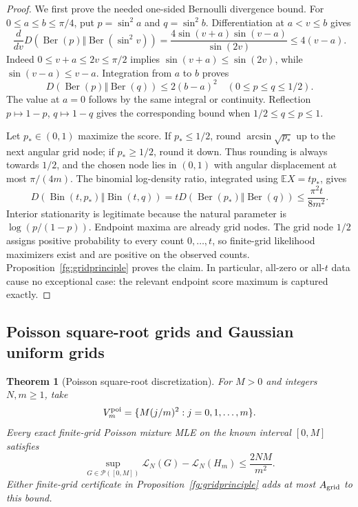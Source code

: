 \documentclass[11pt,a4paper]{article}
\newtheorem{theorem}{Theorem}[section]
\theoremstyle{definition}
\theoremstyle{remark}
\numberwithin{equation}{section}
\begin{document}
\begin{proof}
We first prove the needed one-sided Bernoulli divergence bound.
For $0\le a\le b\le\pi/4$, put $p=\sin^2a$ and $q=\sin^2b$.
Differentiation at $a<v\le b$ gives
\[
 \frac d{dv}D(\operatorname{Ber}(p)\Vert
                       \operatorname{Ber}(\sin^2v))
 =\frac{4\sin(v+a)\sin(v-a)}{\sin(2v)}
 \le4(v-a).
\]
Indeed $0\le v+a\le2v\le\pi/2$ implies
$\sin(v+a)\le\sin(2v)$, while $\sin(v-a)\le v-a$.
Integration from $a$ to $b$ proves
\begin{equation}\label{fg:berkl}
 D(\operatorname{Ber}(p)\Vert\operatorname{Ber}(q))
                \le2(b-a)^2\quad(0\le p\le q\le1/2).
\end{equation}
The value at $a=0$ follows by the same integral or continuity.
Reflection $p\mapsto1-p$, $q\mapsto1-q$ gives the corresponding
bound when $1/2\le q\le p\le1$.

Let $p_*\in(0,1)$ maximize the score. If $p_*\le1/2$, round
$\arcsin\sqrt{p_*}$ up to the next angular grid node; if $p_*\ge1/2$,
round it down. Thus rounding is always towards $1/2$, and the chosen
node lies in $(0,1)$ with angular displacement at most $\pi/(4m)$.
The binomial log-density ratio, integrated using $\mathbb E X=tp_*$,
gives
\[
 D(\operatorname{Bin}(t,p_*)\Vert\operatorname{Bin}(t,q))
 =tD(\operatorname{Ber}(p_*)\Vert\operatorname{Ber}(q))
 \le\frac{\pi^2t}{8m^2}.
\]
Interior stationarity is legitimate because the natural parameter is
$\log(p/(1-p))$. Endpoint maxima are already grid nodes. The grid
node $1/2$ assigns positive probability to every count $0,\ldots,t$,
so finite-grid likelihood maximizers exist and are positive on the
observed counts. Proposition~\ref{fg:gridprinciple} proves the claim.
In particular, all-zero or all-$t$ data cause no exceptional case:
the relevant endpoint score maximum is captured exactly.
\end{proof}

\subsection{Poisson square-root grids and Gaussian uniform grids}

\begin{theorem}[Poisson square-root discretization]
\label{fg:poisson}
For $M>0$ and integers $N,m\ge1$, take
\[
             V_m^{\rm poi}=\{M(j/m)^2:j=0,1,\ldots,m\}.
\]
Every exact finite-grid Poisson mixture MLE on the known interval
$[0,M]$ satisfies
\begin{equation}\label{fg:poideficit}
 \sup_{G\in\mathcal P([0,M])}\mathcal L_N(G)-\mathcal L_N(H_m)
                                      \le\frac{2NM}{m^2}.
\end{equation}
Either finite-grid certificate in Proposition~\ref{fg:gridprinciple}
adds at most $A_{\rm grid}$ to this bound.
\end{theorem}
\end{document}
